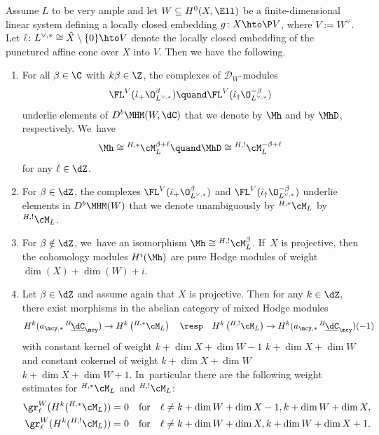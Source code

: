 \begin{prop} \label{prop:directImageOfOBetaMHM}
Assume $L$ to be very ample and let $W \subseteq H^0(X,\Ell)$ be a finite-dimensional linear system defining a locally closed embedding $g \colon X \hto \P V$, where $V := W^\vee$. Let $\hat\iota \colon L^{\vee,*} \cong \hat{X} \setminus \{0\} \hto V$ denote the locally closed embedding of the punctured affine cone over $X$ into $V$. Then we have the following.
\begin{enumerate}
\item\label{prop:directImageOfOBetaMHM1}
For all $\beta \in \C$ with $k\beta \in \Z$, the complexes of $\mathscr D_W$\nobreakdash-mod\-ules
\[
\FL^V(\hat\iota_+ \O_{L^{\vee,*}}^\beta)
\quand
\FL^V(\hat\iota_\dag \O_{L^{\vee,*}}^{-\beta})
\]
underlie elements of $D^b\MHM(W,\dC)$
that we denote by $\Mh$ and by $\MhD$, respectively. We~have
\[
\Mh \cong {^{H,*}}\cM_L^{\beta+\ell}
\quand
\MhD \cong {^{H,!}}\cM_L^{-\beta+\ell}
\]
for any $\ell\in \dZ$.
\item\label{prop:directImageOfOBetaMHM2}
For $\beta\in \dZ$, the complexes $\FL^V(\hat\iota_+ \O_{L^{\vee,*}}^\beta)$ and $\FL^V(\hat\iota_\dag \O_{L^{\vee,*}}^{-\beta})$ underlie elements in $D^b\MHM(W)$
that we denote unambiguously by ${^{H,*}}\cM_L$ \resp by ${^{H,!}}\cM_L$.

\item\label{prop:directImageOfOBetaMHM3}
For $\beta \notin \dZ$, we~have an isomorphism
$\Mh \cong {^{H,!}}\cM_L^{\beta}$. If~$X$ is projective, then the cohomology modules
$H^i(\Mh)$ are pure Hodge modules of weight $\dim(X)+\dim(W)+i$.

\item\label{prop:directImageOfOBetaMHM4}
Let $\beta\in\dZ$ and assume again that $X$ is projective. Then for any $k\in \dZ$,
there exist morphisms in the abelian category of mixed Hodge modules
\[
H^k(a_{\mcy,*} \, ^{H\!}\underline{\dC}_{\mcy}) \to H^{k} \left({^{H,*}}\cM_L\right) \quad \text{\resp} \quad H^{k} \left({^{H,!}}\cM_L\right) \to H^k(a_{\mcy,*} \, ^{H\!}\underline{\dC}_{\mcy})(-1)
\]
with constant kernel of weight $k+ \dim X + \dim W -1$ \resp $k+ \dim X + \dim W$ and constant cokernel of weight $k+ \dim X + \dim W $ \resp $k+ \dim X + \dim W+1$. In~particular there are the following weight estimates for ${^{H,*}}\cM_L$ and ${^{H,!}}\cM_L$:
\begin{align*}
\gr^W_\ell (H^k({^{H,*}}\cM_L)) = 0 &\quad \text{for} \quad \ell \neq k+ \dim W +\dim X -1,k+ \dim W +\dim X,\\
\gr^W_\ell (H^k({^{H,!}}\cM_L)) = 0 &\quad \text{for} \quad \ell \neq k+ \dim W +\dim X,k+ \dim W +\dim X+1.
\end{align*}
\end{enumerate}
\end{prop}

